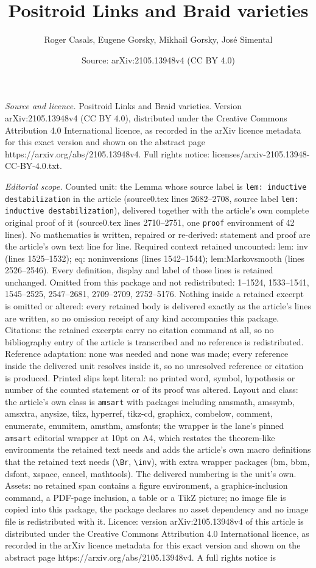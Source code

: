 \documentclass[10pt,a4paper]{amsart}
\title[Positroid Links and Braid varieties]{Positroid Links and Braid varieties}
\author{Roger Casals, Eugene Gorsky, Mikhail Gorsky, Jos\'e Simental}
\date{Source: arXiv:2105.13948v4 (CC BY 4.0)}
\begin{document}
\maketitle

\noindent\emph{Source and licence.} Positroid Links and Braid varieties. Version arXiv:2105.13948v4 (CC BY 4.0), distributed under the Creative Commons Attribution 4.0 International licence, as recorded in the arXiv licence metadata for this exact version and shown on the abstract page https://arxiv.org/abs/2105.13948v4. Full rights notice: licenses/arxiv-2105.13948-CC-BY-4.0.txt.\par\smallskip

\noindent\textit{Editorial scope.} Counted unit: the Lemma whose source label is \texttt{lem: inductive destabilization} in the article (source0.tex lines 2682--2708, source label \texttt{lem: inductive destabilization}), delivered together with the article's own complete original proof of it (source0.tex lines 2710--2751, one \texttt{proof} environment of 42 lines). No mathematics is written, repaired or re-derived: statement and proof are the article's own text line for line. Required context retained uncounted: lem: inv (lines 1525--1532); eq: noninversions (lines 1542--1544); lem:Markovsmooth (lines 2526--2546). Every definition, display and label of those lines is retained unchanged. Omitted from this package and not redistributed: 1--1524, 1533--1541, 1545--2525, 2547--2681, 2709--2709, 2752--5176. Nothing inside a retained excerpt is omitted or altered: every retained body is delivered exactly as the article's lines are written, so no omission receipt of any kind accompanies this package. Citations: the retained excerpts carry no citation command at all, so no bibliography entry of the article is transcribed and no reference is redistributed. Reference adaptation: none was needed and none was made; every reference inside the delivered unit resolves inside it, so no unresolved reference or citation is produced. Printed slips kept literal: no printed word, symbol, hypothesis or number of the counted statement or of its proof was altered. Layout and class: the article's own class is \texttt{amsart} with packages including amsmath, amssymb, amsxtra, anysize, tikz, hyperref, tikz-cd, graphicx, combelow, comment, enumerate, enumitem, amsthm, amsfonts; the wrapper is the lane's pinned \texttt{amsart} editorial wrapper at 10pt on A4, which restates the theorem-like environments the retained text needs and adds the article's own macro definitions that the retained text needs (\texttt{\textbackslash Br}, \texttt{\textbackslash inv}), with extra wrapper packages (bm, bbm, dsfont, xspace, cancel, mathtools). The delivered numbering is the unit's own. Assets: no retained span contains a figure environment, a graphics-inclusion command, a PDF-page inclusion, a table or a TikZ picture; no image file is copied into this package, the package declares no asset dependency and no image file is redistributed with it. Licence: version arXiv:2105.13948v4 of this article is distributed under the Creative Commons Attribution 4.0 International licence, as recorded in the arXiv licence metadata for this exact version and shown on the abstract page https://arxiv.org/abs/2105.13948v4. A full rights notice is 
\end{document}
